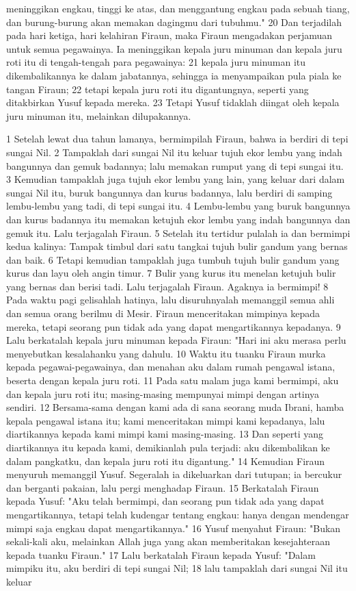\begin{biblechapter}
meninggikan engkau, tinggi ke atas, dan menggantung engkau pada sebuah tiang, dan burung-burung akan memakan dagingmu dari tubuhmu." 20 Dan terjadilah pada hari ketiga, hari kelahiran Firaun, maka Firaun mengadakan perjamuan untuk semua pegawainya. Ia meninggikan kepala juru minuman dan kepala juru roti itu di tengah-tengah para pegawainya: 21 kepala juru minuman itu dikembalikannya ke dalam jabatannya, sehingga ia menyampaikan pula piala ke tangan Firaun; 22 tetapi kepala juru roti itu digantungnya, seperti yang ditakbirkan Yusuf kepada mereka. 23 Tetapi Yusuf tidaklah diingat oleh kepala juru minuman itu, melainkan dilupakannya.
\end{biblechapter}

\begin{biblechapter} %
1 Setelah lewat dua tahun lamanya, bermimpilah Firaun, bahwa ia berdiri di tepi sungai Nil. 2 Tampaklah dari sungai Nil itu keluar tujuh ekor lembu yang indah bangunnya dan gemuk badannya; lalu memakan rumput yang di tepi sungai itu. 3 Kemudian tampaklah juga tujuh ekor lembu yang lain, yang keluar dari dalam sungai Nil itu, buruk bangunnya dan kurus badannya, lalu berdiri di samping lembu-lembu yang tadi, di tepi sungai itu. 4 Lembu-lembu yang buruk bangunnya dan kurus badannya itu memakan ketujuh ekor lembu yang indah bangunnya dan gemuk itu. Lalu terjagalah Firaun. 5 Setelah itu tertidur pulalah ia dan bermimpi kedua kalinya: Tampak timbul dari satu tangkai tujuh bulir gandum yang bernas dan baik. 6 Tetapi kemudian tampaklah juga tumbuh tujuh bulir gandum yang kurus dan layu oleh angin timur. 7 Bulir yang kurus itu menelan ketujuh bulir yang bernas dan berisi tadi. Lalu terjagalah Firaun. Agaknya ia bermimpi! 8 Pada waktu pagi gelisahlah hatinya, lalu disuruhnyalah memanggil semua ahli dan semua orang berilmu di Mesir. Firaun menceritakan mimpinya kepada mereka, tetapi seorang pun tidak ada yang dapat mengartikannya kepadanya. 9 Lalu berkatalah kepala juru minuman kepada Firaun: "Hari ini aku merasa perlu menyebutkan kesalahanku yang dahulu. 10 Waktu itu tuanku Firaun murka kepada pegawai-pegawainya, dan menahan aku dalam rumah pengawal istana, beserta dengan kepala juru roti. 11 Pada satu malam juga kami bermimpi, aku dan kepala juru roti itu; masing-masing mempunyai mimpi dengan artinya sendiri. 12 Bersama-sama dengan kami ada di sana seorang muda Ibrani, hamba kepala pengawal istana itu; kami menceritakan mimpi kami kepadanya, lalu diartikannya kepada kami mimpi kami masing-masing. 13 Dan seperti yang diartikannya itu kepada kami, demikianlah pula terjadi: aku dikembalikan ke dalam pangkatku, dan kepala juru roti itu digantung." 14 Kemudian Firaun menyuruh memanggil Yusuf. Segeralah ia dikeluarkan dari tutupan; ia bercukur dan berganti pakaian, lalu pergi menghadap Firaun. 15 Berkatalah Firaun kepada Yusuf: "Aku telah bermimpi, dan seorang pun tidak ada yang dapat mengartikannya, tetapi telah kudengar tentang engkau: hanya dengan mendengar mimpi saja engkau dapat mengartikannya." 16 Yusuf menyahut Firaun: "Bukan sekali-kali aku, melainkan Allah juga yang akan memberitakan kesejahteraan kepada tuanku Firaun." 17 Lalu berkatalah Firaun kepada Yusuf: "Dalam mimpiku itu, aku berdiri di tepi sungai Nil; 18 lalu tampaklah dari sungai Nil itu keluar 
\end{biblechapter}
